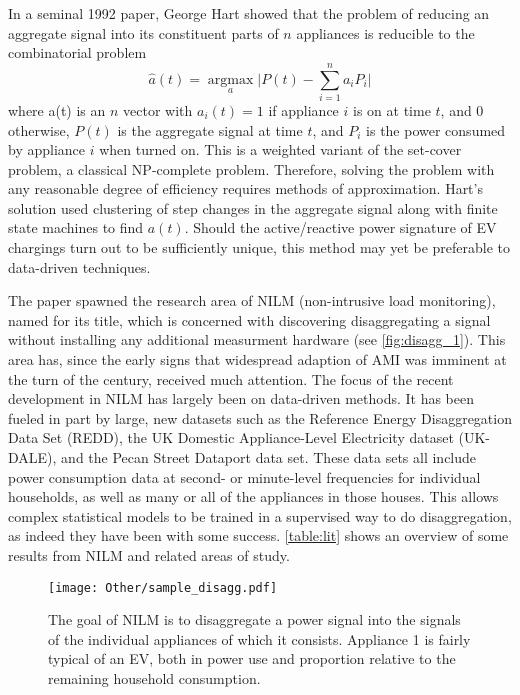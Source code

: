 \documentclass[12pt, american]{article}
\begin{document}
In a seminal 1992 paper\cite{Hart1992}, %
 George Hart showed that the problem of reducing an aggregate signal into its constituent parts of $n$ appliances is reducible to the combinatorial problem \begin{equation}
\hat{a}(t) = \underset{a}{\operatorname{argmax}} \big|P(t) - \sum\limits_{i=1}^n a_{i}P_{i}\big|
\label{eq:disaggregation_formula}
\end{equation}
where a(t) is an $n$ vector with $a_{i}(t) = 1$ if appliance $i$ is on at time $t$, and 0 otherwise, $P(t)$ is the aggregate signal at time $t$, and $P_i$ is the power consumed by appliance $i$ when turned on. This is a weighted variant of the set-cover problem, a classical NP-complete problem\cite{Garey1979}. Therefore, solving the problem with any reasonable degree of efficiency requires methods of approximation. Hart's solution used clustering of step changes in the aggregate signal along with finite state machines to find $a(t)$. Should the active/reactive power signature of EV chargings turn out to be sufficiently unique, this method may yet be preferable to data-driven techniques.

The paper spawned the research area of NILM (non-intrusive load monitoring), named for its title, which is concerned with discovering disaggregating a signal without installing any additional measurment hardware (see \autoref{fig:disagg_1}). This area has, since the early signs that widespread adaption of AMI was imminent at the turn of the century, received much attention\cite{RevueltaHerrero2018}. The focus of the recent development in NILM has largely been on data-driven methods. It has been fueled in part by large, new datasets such as the Reference Energy Disaggregation Data Set (REDD)\cite{Kolter2011}, the UK Domestic Appliance-Level Electricity dataset (UK-DALE)\cite{Kelly2015}, and the Pecan Street Dataport data set\cite{Pecan2018}. These data sets all include power consumption data at second- or minute-level frequencies for individual households, as well as many or all of the appliances in those houses. This allows complex statistical models to be trained in a supervised way to do disaggregation, as indeed they have been with some success\cite{Kelly2015c,RevueltaHerrero2018}. \autoref{table:lit} shows an overview of some results from NILM and related areas of study.
 
\begin{figure}[h]
\centering
\def\svgwidth{\columnwidth}
\caption{The goal of NILM is to disaggregate a power signal into the signals of the individual appliances of which it consists. Appliance 1 is fairly typical of an EV, both in power use and proportion relative to the remaining household consumption.}
\texttt{[image: Other/sample\_disagg.pdf]}
\label{fig:disagg_1}
\end{figure}
\end{document}
